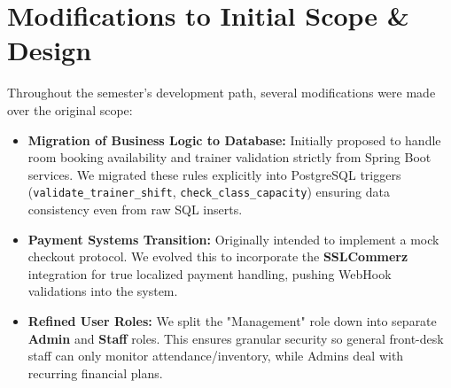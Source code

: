 \documentclass[12pt,a4paper]{article}
\begin{document}
\section{Modifications to Initial Scope \& Design}
Throughout the semester's development path, several modifications were made over the original scope:
\begin{itemize}
    \item \textbf{Migration of Business Logic to Database:} Initially proposed to handle room booking availability and trainer validation strictly from Spring Boot services. We migrated these rules explicitly into PostgreSQL triggers (\texttt{validate\_trainer\_shift}, \texttt{check\_class\_capacity}) ensuring data consistency even from raw SQL inserts.
    \item \textbf{Payment Systems Transition:} Originally intended to implement a mock checkout protocol. We evolved this to incorporate the \textbf{SSLCommerz} integration for true localized payment handling, pushing WebHook validations into the system.
    \item \textbf{Refined User Roles:} We split the "Management" role down into separate \textbf{Admin} and \textbf{Staff} roles. This ensures granular security so general front-desk staff can only monitor attendance/inventory, while Admins deal with recurring financial plans.
\end{itemize}

\newpage
\end{document}
